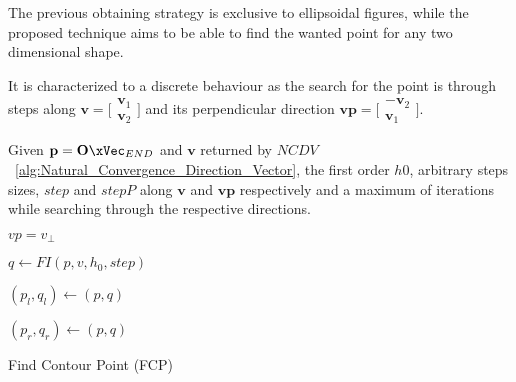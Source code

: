 The previous obtaining strategy is exclusive to ellipsoidal figures, while the proposed  technique aims to be able to find the wanted point for any two dimensional shape. \par 
It is characterized to a discrete behaviour as the search for the point is through steps along \(\mathbf{v} = \bigl[\begin{smallmatrix} \mathbf{v}_1 \\ \mathbf{v}_2 \end{smallmatrix}\bigr]\) and its perpendicular direction \(\mathbf{vp} = \bigl[\begin{smallmatrix} -\mathbf{v}_2 \\ \mathbf{v}_1 \end{smallmatrix}\bigr]\).  \par
Given \(\mathbf{p} = \mathbf{O}\xVec_{END}\) and \(\mathbf{v}\) returned by \(NCDV\)~\ref{alg:Natural_Convergence_Direction_Vector}, the first order  \(h0\), arbitrary  steps sizes, \(step\) and \(stepP\) along \(\mathbf{v}\) and \(\mathbf{vp}\) respectively and a maximum of iterations while searching through the respective directions. 

\newpage %

  \begin{algorithm}

    $vp = v_{\perp}$

    $q \gets FI(p, v, h_0, step)$  

    $(p_l, q_l) \gets (p, q)$ 
     
    $(p_r, q_r) \gets (p, q)$  

    
    \caption{Find Contour Point (FCP)} \label{alg:Find_Contour_Point}
  \end{algorithm}

